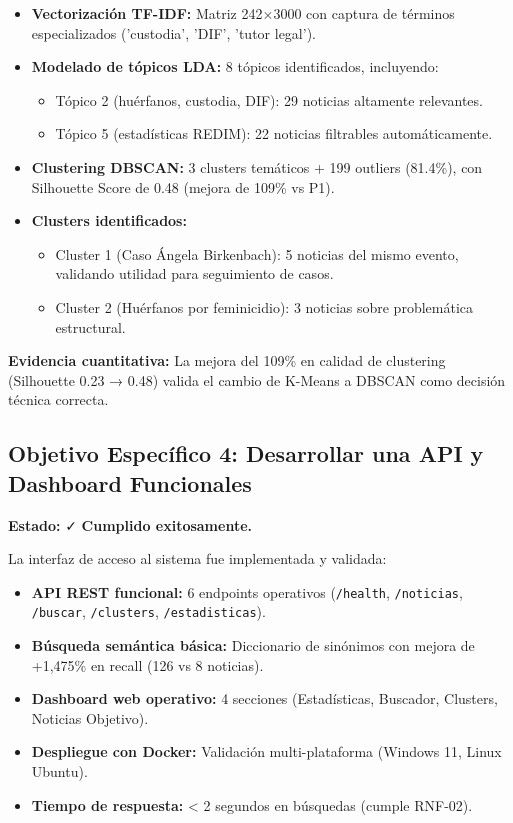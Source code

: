 \begin{itemize}
    \item \textbf{Vectorización TF-IDF:} Matriz 242×3000 con captura de términos especializados ('custodia', 'DIF', 'tutor legal').
    \item \textbf{Modelado de tópicos LDA:} 8 tópicos identificados, incluyendo:
    \begin{itemize}
        \item Tópico 2 (huérfanos, custodia, DIF): 29 noticias altamente relevantes.
        \item Tópico 5 (estadísticas REDIM): 22 noticias filtrables automáticamente.
    \end{itemize}
    \item \textbf{Clustering DBSCAN:} 3 clusters temáticos + 199 outliers (81.4\%), con Silhouette Score de 0.48 (mejora de 109\% vs P1).
    \item \textbf{Clusters identificados:}
    \begin{itemize}
        \item Cluster 1 (Caso Ángela Birkenbach): 5 noticias del mismo evento, validando utilidad para seguimiento de casos.
        \item Cluster 2 (Huérfanos por feminicidio): 3 noticias sobre problemática estructural.
    \end{itemize}
\end{itemize}

\textbf{Evidencia cuantitativa:} La mejora del 109\% en calidad de clustering (Silhouette 0.23 → 0.48) valida el cambio de K-Means a DBSCAN como decisión técnica correcta.

\subsection{Objetivo Específico 4: Desarrollar una API y Dashboard Funcionales}
\label{subsec:obj4_cumplido}

\textbf{Estado:} ✓ \textbf{Cumplido exitosamente.}

La interfaz de acceso al sistema fue implementada y validada:

\begin{itemize}
    \item \textbf{API REST funcional:} 6 endpoints operativos (\texttt{/health}, \texttt{/noticias}, \texttt{/buscar}, \texttt{/clusters}, \texttt{/estadisticas}).
    \item \textbf{Búsqueda semántica básica:} Diccionario de sinónimos con mejora de +1,475\% en recall (126 vs 8 noticias).
    \item \textbf{Dashboard web operativo:} 4 secciones (Estadísticas, Buscador, Clusters, Noticias Objetivo).
    \item \textbf{Despliegue con Docker:} Validación multi-plataforma (Windows 11, Linux Ubuntu).
    \item \textbf{Tiempo de respuesta:} < 2 segundos en búsquedas (cumple RNF-02).
\end{itemize}

